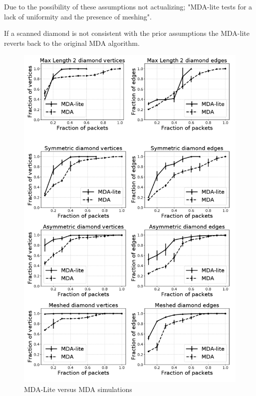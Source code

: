 Due to the possibility of these assumptions not actualizing; "MDA-lite tests for a lack of uniformity and the presence of meshing". \cite{MDA-lite} 

If a scanned diamond is not consistent with the prior assumptions the MDA-lite reverts back to the original MDA algorithm. 

\begin{figure}[!ht]
  \begin{center}
    \includegraphics[scale=0.3]{images/MDA_lite.png}
    \caption{MDA-Lite versus MDA simulations\cite{MDA-lite}}
    \label{figure:MDA_lite_fig}
  \end{center}
\end{figure}


